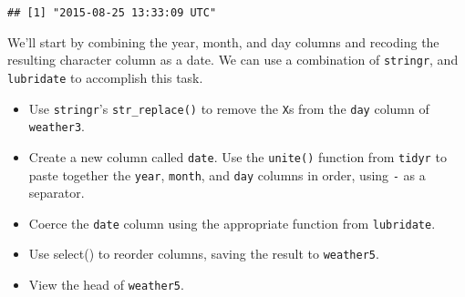 \documentclass[]{article}
\newenvironment{Shaded}{\begin{snugshade}}{\end{snugshade}}
\newcommand{\KeywordTok}[1]{\textcolor[rgb]{0.13,0.29,0.53}{\textbf{#1}}}
\newcommand{\DataTypeTok}[1]{\textcolor[rgb]{0.13,0.29,0.53}{#1}}
\newcommand{\StringTok}[1]{\textcolor[rgb]{0.31,0.60,0.02}{#1}}
\newcommand{\CommentTok}[1]{\textcolor[rgb]{0.56,0.35,0.01}{\textit{#1}}}
\newcommand{\OperatorTok}[1]{\textcolor[rgb]{0.81,0.36,0.00}{\textbf{#1}}}
\newcommand{\NormalTok}[1]{#1}
\begin{document}
\begin{verbatim}
## [1] "2015-08-25 13:33:09 UTC"
\end{verbatim}

We'll start by combining the year, month, and day columns and recoding
the resulting character column as a date. We can use a combination of
\texttt{stringr}, and \texttt{lubridate} to accomplish this task.

\begin{itemize}
\item
  Use \texttt{stringr}'s \texttt{str\_replace()} to remove the
  \texttt{X}s from the \texttt{day} column of \texttt{weather3}.
\item
  Create a new column called \texttt{date}. Use the \texttt{unite()}
  function from \texttt{tidyr} to paste together the \texttt{year},
  \texttt{month}, and \texttt{day} columns in order, using \texttt{-} as
  a separator.
\item
  Coerce the \texttt{date} column using the appropriate function from
  \texttt{lubridate}.
\item
  Use select() to reorder columns, saving the result to
  \texttt{weather5}.
\item
  View the head of \texttt{weather5}.
\end{itemize}

\begin{Shaded}
\end{Shaded}
\end{document}
